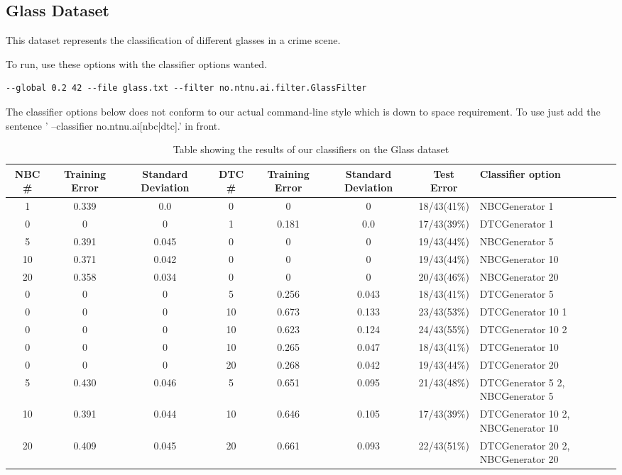 \subsection{Glass Dataset}\label{glass dataset}
This dataset represents the classification of different glasses in a crime scene.

To run, use these options with the classifier options wanted.

\begin{lstlisting}[label=lst:glass, caption=Glass dataset general options]
--global 0.2 42 --file glass.txt --filter no.ntnu.ai.filter.GlassFilter
\end{lstlisting}

The classifier options below does not conform to our actual command-line style
which is down to space requirement. To use just add the sentence '
--classifier no.ntnu.ai[nbc|dtc].' in front.

\begin{landscape}
\begin{table}
\begin{tabular}{|c|c|c||c|c|c||c||p{5cm}|}
\hline
NBC \# & Training Error & Standard Deviation & DTC \# & Training Error
& Standard Deviation & Test Error & Classifier option \\ \hline
1 & 0.339 & 0.0 & 0 & 0 & 0 & 18/43(41\%) & NBCGenerator 1 \\ \hline
0 & 0 & 0 & 1 & 0.181 & 0.0 & 17/43(39\%) & DTCGenerator 1 \\ \hline
5 & 0.391 & 0.045 & 0 & 0 & 0 & 19/43(44\%) & NBCGenerator 5 \\ \hline
10 & 0.371 & 0.042 & 0 & 0 & 0 & 19/43(44\%) & NBCGenerator 10 \\ \hline
20 & 0.358 & 0.034 & 0 & 0 & 0 & 20/43(46\%) & NBCGenerator 20 \\ \hline
0 & 0 & 0 & 5 & 0.256 & 0.043 & 18/43(41\%) & DTCGenerator 5 \\ \hline
0 & 0 & 0 & 10 & 0.673 & 0.133 & 23/43(53\%) & DTCGenerator 10 1 \\ \hline
0 & 0 & 0 & 10 & 0.623 & 0.124 & 24/43(55\%) & DTCGenerator 10 2 \\ \hline
0 & 0 & 0 & 10 & 0.265 & 0.047 & 18/43(41\%) & DTCGenerator 10 \\ \hline
0 & 0 & 0 & 20 & 0.268 & 0.042 & 19/43(44\%) & DTCGenerator 20 \\ \hline
5 & 0.430 & 0.046 & 5 & 0.651 & 0.095 & 21/43(48\%) & DTCGenerator 5 2, 
NBCGenerator 5 \\ \hline
10 & 0.391 & 0.044 & 10 & 0.646 & 0.105 & 17/43(39\%) & DTCGenerator 10 2, 
NBCGenerator 10 \\ \hline
20 & 0.409 & 0.045 & 20 & 0.661 & 0.093 & 22/43(51\%) & DTCGenerator 20 2, 
NBCGenerator 20 \\ \hline
\hline
\end{tabular}
\label{tab:glass}
\caption{Table showing the results of our classifiers on the Glass dataset}
\end{table}
\end{landscape}
